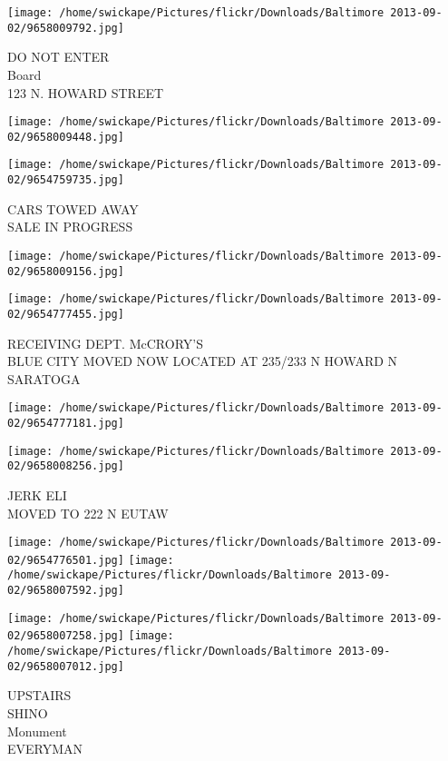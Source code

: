 \documentclass[10pt,letterpaper]{article}
\begin{document}
\vspace{0.25in}
\texttt{[image: /home/swickape/Pictures/flickr/Downloads/Baltimore 2013-09-02/9658009792.jpg]}

DO NOT ENTER\\
Board\\
123 N. HOWARD STREET
\pagebreak

\texttt{[image: /home/swickape/Pictures/flickr/Downloads/Baltimore 2013-09-02/9658009448.jpg]}

\vspace{0.25in}
\texttt{[image: /home/swickape/Pictures/flickr/Downloads/Baltimore 2013-09-02/9654759735.jpg]}

CARS TOWED AWAY\\
SALE IN PROGRESS
\pagebreak

\texttt{[image: /home/swickape/Pictures/flickr/Downloads/Baltimore 2013-09-02/9658009156.jpg]}

\vspace{0.25in}
\texttt{[image: /home/swickape/Pictures/flickr/Downloads/Baltimore 2013-09-02/9654777455.jpg]}

RECEIVING DEPT. McCRORY'S\\
BLUE CITY MOVED NOW LOCATED AT 235/233 N HOWARD N SARATOGA
\pagebreak

\texttt{[image: /home/swickape/Pictures/flickr/Downloads/Baltimore 2013-09-02/9654777181.jpg]}

\vspace{0.25in}
\texttt{[image: /home/swickape/Pictures/flickr/Downloads/Baltimore 2013-09-02/9658008256.jpg]}

JERK ELI\\
MOVED TO 222 N EUTAW
\pagebreak

\texttt{[image: /home/swickape/Pictures/flickr/Downloads/Baltimore 2013-09-02/9654776501.jpg]}
\texttt{[image: /home/swickape/Pictures/flickr/Downloads/Baltimore 2013-09-02/9658007592.jpg]}

\texttt{[image: /home/swickape/Pictures/flickr/Downloads/Baltimore 2013-09-02/9658007258.jpg]}
\texttt{[image: /home/swickape/Pictures/flickr/Downloads/Baltimore 2013-09-02/9658007012.jpg]}

UPSTAIRS\\
SHINO\\
Monument\\
EVERYMAN
\pagebreak
\end{document}
